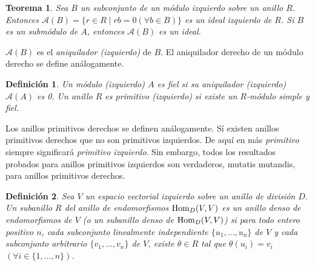 \documentclass{report}
\newcommand{\Hom}{\textnormal{Hom}}
\newtheorem{theorem}{Teorema}
\newtheorem{definition}{Definición}
\begin{document}
  \begin{theorem}
    \label{theorem:anihilatorTheorem}
    Sea \(B\) un subconjunto de un módulo izquierdo sobre un anillo \(R\).
    Entonces \(\mathcal{A}(B) = \{r \in R \mid r b = 0 (\forall b \in B)\}\) es un ideal izquierdo de \(R\).
    Si \(B\) es un submódulo de \(A\), entonces \(\mathcal{A}(B)\) es un ideal.
  \end{theorem}
  \(\mathcal{A}(B)\) es el \emph{aniquilador (izquierdo)} de \(B\).
  El aniquilador derecho de un módulo derecho se define análogamente.

  \begin{definition}
    Un módulo (izquierdo) \(A\) es \emph{fiel} si su aniquilador (izquierdo) \(\mathcal{A}(A)\) es 0.
    Un anillo \(R\) es \emph{primitivo} (\emph{izquierdo}) si existe un \(R\)-módulo simple y fiel.
  \end{definition}

  Los anillos primitivos derechos se definen análogamente.
  Sí existen anillos primitivos derechos que no son primitivos izquierdos.
  De aquí en más \emph{primitivo} siempre significará \emph{primitivo izquierdo}.
  Sin embargo, todos los resultados probados para anillos primitivos izquierdos son verdaderos, mutatis mutandis, para anillos primitivos derechos.

  \begin{definition}
    Sea \(V\) un espacio vectorial izquierdo sobre un anillo de división \(D\).
    Un subanillo \(R\) del anillo de endomorfismos \(\Hom_D(V, V)\) es un \emph{anillo denso de endomorfismos} de \(V\) (o un \emph{subanillo denso} de \(\Hom_D(V, V)\)) si para todo entero positivo \(n\), cada subconjunto linealmente independiente \(\{u_1, \dots, u_n\}\) de \(V\) y cada subconjunto arbitrario \(\{v_1, \dots, v_n\}\) de \(V\), existe \(\theta \in R\) tal que \(\theta(u_i) = v_i\) \((\forall i \in \{1, \dots, n\})\).
  \end{definition}
\end{document}
